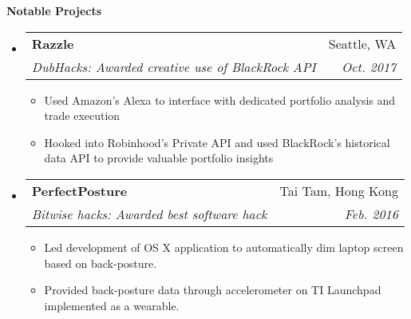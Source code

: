 \documentclass[letterpaper,10pt]{article}
\makeatletter
\newcommand{\resitem}[1]{\item #1 \vspace{-2pt}}
\newcommand{\resheading}[1]{{\large \colorbox{mygrey}{\begin{minipage}{\textwidth}{\textbf{#1 \vphantom{p\^{E}}}}\end{minipage}}}}
\newcommand{\ressubheading}[4]{
\begin{tabular*}{7.0in}{l@{\extracolsep{\fill}}r}
		\textbf{#1} & #2 \\
		\textit{#3} & \textit{#4} \\
\end{tabular*}\vspace{-6pt}}
\makeatother
\begin{document}
\resheading{Notable Projects}
\begin{itemize}
\item
	\ressubheading{Razzle}{Seattle, WA}{DubHacks: Awarded creative use of BlackRock API}{Oct. 2017}
	\begin{itemize}
		\resitem{Used Amazon's Alexa to interface with dedicated portfolio analysis and trade execution}
		\resitem{Hooked into Robinhood's Private API and used BlackRock's historical data API to provide valuable portfolio insights}
	\end{itemize}
\item
	\ressubheading{PerfectPosture}{Tai Tam, Hong Kong}{Bitwise hacks: Awarded best software hack}{Feb. 2016}
	\begin{itemize}
		\resitem{Led development of OS X application to automatically dim laptop screen based on back-posture.}
		\resitem{Provided back-posture data through accelerometer on TI Launchpad implemented as a wearable.}
	\end{itemize}

\end{itemize}
\end{document}

